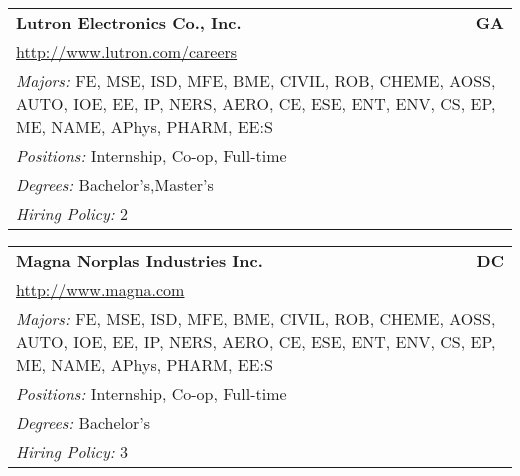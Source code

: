 \documentclass[twoside]{article}
\begin{document}
\begin{center}
\begin{multicols}{3}
\begin{FlushLeft}
\begin{minipage}{\columnwidth}
\end{minipage}
 
\begin{minipage}{\columnwidth}\begin{tabularx}{.95\columnwidth}{Xr}
                 {\Large\bf Lutron Electronics Co., Inc.} & {\Large\bf GA}\\
    \multicolumn{2}{p{.95\columnwidth}}{\url{http://www.lutron.com/careers}}\\
    \multicolumn{2}{p{.95\columnwidth}}{\emph{Majors:} FE, MSE, ISD, MFE, BME, CIVIL, ROB, CHEME, AOSS, AUTO, IOE, EE, IP, NERS, AERO, CE, ESE, ENT, ENV, CS, EP, ME, NAME, APhys, PHARM, EE:S}\\
    \multicolumn{2}{p{.95\columnwidth}}{\emph{Positions:} Internship, Co-op, Full-time}\\
    \multicolumn{2}{p{.95\columnwidth}}{\emph{Degrees:} Bachelor's,Master's}\\
    \multicolumn{2}{p{.95\columnwidth}}{\emph{Hiring Policy:} 2}\\
    \end{tabularx}
    
\end{minipage}
 
\begin{minipage}{\columnwidth}\begin{tabularx}{.95\columnwidth}{Xr}
                 {\Large\bf Magna Norplas Industries Inc.} & {\Large\bf DC}\\
    \multicolumn{2}{p{.95\columnwidth}}{\url{http://www.magna.com}}\\
    \multicolumn{2}{p{.95\columnwidth}}{\emph{Majors:} FE, MSE, ISD, MFE, BME, CIVIL, ROB, CHEME, AOSS, AUTO, IOE, EE, IP, NERS, AERO, CE, ESE, ENT, ENV, CS, EP, ME, NAME, APhys, PHARM, EE:S}\\
    \multicolumn{2}{p{.95\columnwidth}}{\emph{Positions:} Internship, Co-op, Full-time}\\
    \multicolumn{2}{p{.95\columnwidth}}{\emph{Degrees:} Bachelor's}\\
    \multicolumn{2}{p{.95\columnwidth}}{\emph{Hiring Policy:} 3}\\
    \end{tabularx}
    
\end{minipage}
 

\end{FlushLeft}
\end{multicols}
\end{center}
\end{document}
